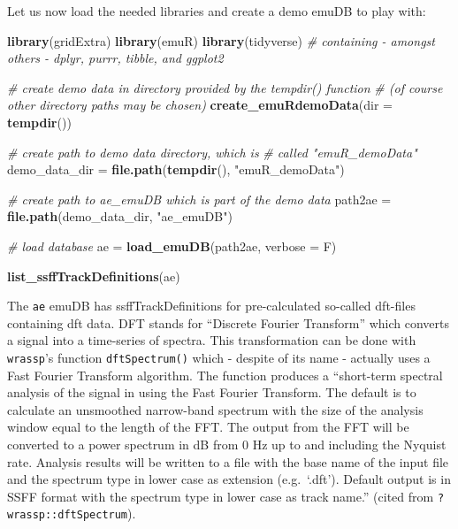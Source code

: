 \documentclass[]{book}
\newenvironment{Shaded}{\begin{snugshade}}{\end{snugshade}}
\newcommand{\CommentTok}[1]{\textcolor[rgb]{0.56,0.35,0.01}{\textit{#1}}}
\newcommand{\DataTypeTok}[1]{\textcolor[rgb]{0.13,0.29,0.53}{#1}}
\newcommand{\KeywordTok}[1]{\textcolor[rgb]{0.13,0.29,0.53}{\textbf{#1}}}
\newcommand{\NormalTok}[1]{#1}
\newcommand{\StringTok}[1]{\textcolor[rgb]{0.31,0.60,0.02}{#1}}
\begin{document}
Let us now load the needed libraries and create a demo emuDB to play with:

\begin{Shaded}
\begin{Highlighting}[]
\KeywordTok{library}\NormalTok{(gridExtra)}
\KeywordTok{library}\NormalTok{(emuR)}
\KeywordTok{library}\NormalTok{(tidyverse) }\CommentTok{# containing - amongst others - dplyr, purrr, tibble, and ggplot2}

\CommentTok{# create demo data in directory provided by the tempdir() function}
\CommentTok{# (of course other directory paths may be chosen)}
\KeywordTok{create_emuRdemoData}\NormalTok{(}\DataTypeTok{dir =} \KeywordTok{tempdir}\NormalTok{())}

\CommentTok{# create path to demo data directory, which is}
\CommentTok{# called "emuR_demoData"}
\NormalTok{demo_data_dir =}\StringTok{ }\KeywordTok{file.path}\NormalTok{(}\KeywordTok{tempdir}\NormalTok{(), }\StringTok{"emuR_demoData"}\NormalTok{)}

\CommentTok{# create path to ae_emuDB which is part of the demo data}
\NormalTok{path2ae =}\StringTok{ }\KeywordTok{file.path}\NormalTok{(demo_data_dir, }\StringTok{"ae_emuDB"}\NormalTok{)}

\CommentTok{# load database}
\NormalTok{ae =}\StringTok{ }\KeywordTok{load_emuDB}\NormalTok{(path2ae, }\DataTypeTok{verbose =}\NormalTok{ F)}

\KeywordTok{list_ssffTrackDefinitions}\NormalTok{(ae)}
\end{Highlighting}
\end{Shaded}

The \texttt{ae} emuDB has ssffTrackDefinitions for pre-calculated so-called dft-files containing dft data. DFT stands for ``Discrete Fourier Transform'' which converts a signal into a time-series of spectra. This transformation can be done with \texttt{wrassp}'s function \texttt{dftSpectrum()} which - despite of its name - actually uses a Fast Fourier Transform algorithm. The function produces a ``short-term spectral analysis of the signal in using the Fast Fourier Transform. The default is to calculate an unsmoothed narrow-band spectrum with the size of the analysis window equal to the length of the FFT. The output from the FFT will be converted to a power spectrum in dB from 0 Hz up to and including the Nyquist rate. Analysis results will be written to a file with the base name of the input file and the spectrum type in lower case as extension (e.g.~`.dft'). Default output is in SSFF format with the spectrum type in lower case as track name.'' (cited from \texttt{?wrassp::dftSpectrum}).
\end{document}

